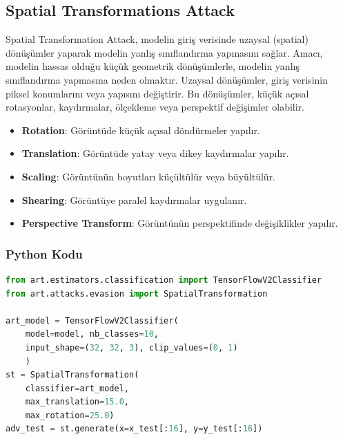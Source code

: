 \newpage

\subsection{Spatial Transformations Attack}

Spatial Transformation Attack, modelin giriş verisinde uzaysal (spatial) dönüşümler yaparak modelin yanlış sınıflandırma yapmasını sağlar. Amacı, modelin hassas olduğu küçük geometrik dönüşümlerle, modelin yanlış sınıflandırma yapmasına neden olmaktır. Uzaysal dönüşümler, giriş verisinin piksel konumlarını veya yapısını değiştirir. Bu dönüşümler, küçük açısal rotasyonlar, kaydırmalar, ölçekleme veya perspektif değişimler olabilir.

\begin{itemize}
    \item \textbf{Rotation}: Görüntüde küçük açısal döndürmeler yapılır.
    \item \textbf{Translation}: Görüntüde yatay veya dikey kaydırmalar yapılır.
    \item \textbf{Scaling}: Görüntünün boyutları küçültülür veya büyültülür.
    \item \textbf{Shearing}: Görüntüye paralel kaydırmalar uygulanır.
    \item \textbf{Perspective Transform}: Görüntünün perspektifinde değişiklikler yapılır.
\end{itemize}

\subsubsection{Python Kodu}

\begin{lstlisting}[language=Python]
from art.estimators.classification import TensorFlowV2Classifier
from art.attacks.evasion import SpatialTransformation

art_model = TensorFlowV2Classifier(
    model=model, nb_classes=10, 
    input_shape=(32, 32, 3), clip_values=(0, 1)
    )
st = SpatialTransformation(
    classifier=art_model, 
    max_translation=15.0, 
    max_rotation=25.0)
adv_test = st.generate(x=x_test[:16], y=y_test[:16])
\end{lstlisting}

\newpage

